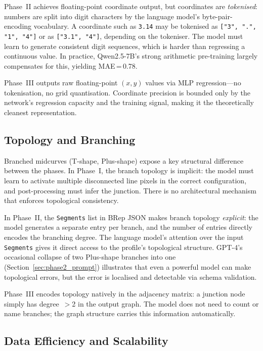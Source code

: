 \documentclass[journal]{IEEEtran}
\begin{document}
Phase~II achieves floating-point coordinate output, but coordinates are
\emph{tokenised}: numbers are split into digit characters by the language
model's byte-pair-encoding vocabulary.  A coordinate such as \texttt{3.14}
may be tokenised as \texttt{["3", ".", "1", "4"]} or as \texttt{["3.1", "4"]},
depending on the tokeniser.  The model must learn to generate consistent
digit sequences, which is harder than regressing a continuous value.  In
practice, Qwen2.5-7B's strong arithmetic pre-training largely compensates for
this, yielding MAE\,=\,0.78.

Phase~III outputs raw floating-point $(x, y)$ values via MLP regression—no
tokenisation, no grid quantisation.  Coordinate precision is bounded only by
the network's regression capacity and the training signal, making it the
theoretically cleanest representation.

\subsection{Topology and Branching}

Branched midcurves (T-shape, Plus-shape) expose a key structural difference
between the phases.  In Phase~I, the branch topology is implicit: the model
must learn to activate multiple disconnected line pixels in the correct
configuration, and post-processing must infer the junction.  There is no
architectural mechanism that enforces topological consistency.

In Phase~II, the \texttt{Segments} list in BRep JSON makes branch topology
\emph{explicit}: the model generates a separate entry per branch, and the
number of entries directly encodes the branching degree.  The language model's
attention over the input \texttt{Segments} gives it direct access to the
profile's topological structure.  GPT-4's occasional collapse of two Plus-shape
branches into one (Section~\ref{sec:phase2_prompt}) illustrates that even a
powerful model can make topological errors, but the error is localised and
detectable via schema validation.

Phase~III encodes topology natively in the adjacency matrix: a junction node
simply has degree~$>$2 in the output graph.  The model does not need to count
or name branches; the graph structure carries this information automatically.

\subsection{Data Efficiency and Scalability}
\end{document}
